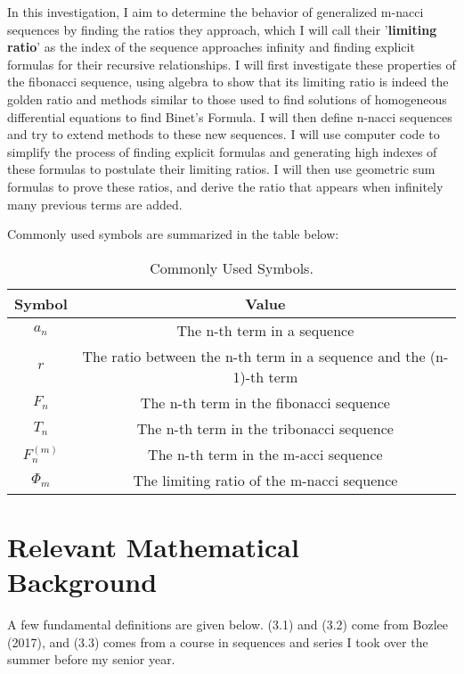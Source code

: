 \documentclass[11pt]{article}
\begin{document}
In this investigation, I aim to determine the behavior of generalized m-nacci sequences by finding the ratios they approach, which I will call their '\textbf{limiting ratio}’ as the index of the sequence approaches infinity and finding explicit formulas for their recursive relationships. I will first investigate these properties of the fibonacci sequence, using algebra to show that its limiting ratio is indeed the golden ratio and methods similar to those used to find solutions of homogeneous differential equations to find Binet’s Formula. I will then define n-nacci sequences and try to extend methods to these new sequences. I will use computer code to simplify the process of finding explicit formulas and generating high indexes of these formulas to postulate their limiting ratios. I will then use geometric sum formulas to prove these ratios, and derive the ratio that appears when infinitely many previous terms are added. 

\noindent Commonly used symbols are summarized in the table below:

\begin{table}[h]
\begin{center}
    \begin{tabular}{ |c|c| } 
    \hline
    \textbf{Symbol} & \textbf{Value} \\
    \hline
    $a_n$ & The n-th term in a sequence \\ 
    \hline
    $r$ & The ratio between the n-th term in a sequence and the (n-1)-th term \\ 
    \hline
    $F_n$ & The n-th term in the fibonacci sequence \\
    \hline
    $T_n$ & The n-th term in the tribonacci sequence \\
    \hline
    $F^{(m)}_n$ & The n-th term in the m-acci sequence \\ 
    \hline
    $\Phi_m$ & The limiting ratio of the m-nacci sequence \\
    \hline
    \end{tabular}
    \caption{Commonly Used Symbols.}
\label{table:1}
\end{center}
\end{table}

\section{Relevant Mathematical Background}
A few fundamental definitions are given below. (3.1) and (3.2) come from Bozlee (2017), and (3.3) comes from a course in sequences and series I took over the summer before my senior year.
\end{document}
